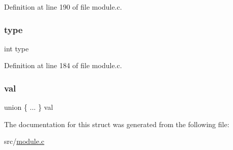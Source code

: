 Definition at line 190 of file module.\+c.

\mbox{\label{struct_redis_module_call_reply_ac765329451135abec74c45e1897abf26}} 
\subsubsection{\texorpdfstring{type}{type}}
{\footnotesize\ttfamily int type}



Definition at line 184 of file module.\+c.

\mbox{\label{struct_redis_module_call_reply_adceb462742f61786b2f766e71de4cabd}} 
\subsubsection{\texorpdfstring{val}{val}}
{\footnotesize\ttfamily union \{ ... \}   val}



The documentation for this struct was generated from the following file\+:\begin{DoxyCompactItemize}
\item 
src/\hyperlink{module_8c}{module.\+c}\end{DoxyCompactItemize}
